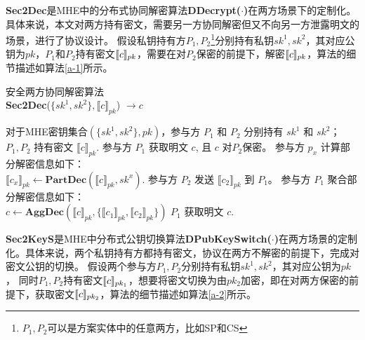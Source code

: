\textbf{Sec2Dec}是MHE中的分布式协同解密算法\textbf{DDecrypt($\cdot$)}在两方场景下的定制化。具体来说，本文对两方持有密文，需要另一方协同解密但又不向另一方泄露明文的场景，进行了协议设计。
假设私钥持有方$P_1,P_2$\footnote{$P_1,P_2$可以是方案实体中的任意两方，比如SP和CS}分别持有私钥$sk^1, sk^2$，其对应公钥为$ pk $，$ P_1 $和$P_2$持有密文$\ctx[pk]{c}$，需要在对$P_2$保密的前提下，解密$\ctx[pk]{c}$，算法的细节描述如算法\ref{a-1}所示。
\begin{algorithm}[htbp]
	\caption{安全两方协同解密算法\\ \textbf{Sec2Dec}($\{sk^1, sk^2\}, \llbracket c\rrbracket_{pk}$) $\rightarrow c$}
	\label{a-1}
	\begin{algorithmic}[1]
		\REQUIRE 对于MHE密钥集合$(\{sk^1, sk^2\}, pk)$，参与方 $P_1$ 和 $P_2$ 分别持有 $sk^1$ 和 $sk^2$；$P_1, P_2$ 持有密文 $\llbracket c\rrbracket_{pk}$.
		\ENSURE 参与方 $P_1$ 获取明文 $c$, 且 $c$ 对$ P_2 $保密。
		\STATE 参与方 $p_x$ 计算部分解密信息如下：\\ $\llbracket c_x\rrbracket_{pk} \leftarrow \textbf{PartDec}(\llbracket c\rrbracket_{pk}, sk^x)$. 
		\ENDFOR
		\STATE 参与方 $P_2$ 发送 $\llbracket c_2\rrbracket_{pk}$ 到 $P_1$。
		\STATE 参与方 $P_1$ 聚合部分解密信息如下：\\ $c \leftarrow \textbf{AggDec}(\llbracket c\rrbracket_{pk}, \{\llbracket c_1\rrbracket_{pk}, \llbracket c_2\rrbracket_{pk}\})$
		\RETURN $P_1$ 获取明文 $ c $.
	\end{algorithmic}
\end{algorithm}

\textbf{Sec2KeyS}是MHE中分布式公钥切换算法\textbf{DPubKeySwitch($ \cdot $)}在两方场景的定制化。具体来说，两个私钥持有方都持有密文，协议在两方不解密的前提下，完成对密文公钥的切换。
假设两个参与方$P_1, P_2$分别持有私钥$sk^1, sk^2$，其对应公钥为$ pk $，
同时$P_1, P_2$持有密文$ \ctx[pk_1]{c} $，想要将密文切换为由$ pk_2 $加密，即在对两方保密的前提下，获取密文$ \ctx[pk_2]{c} $，算法的细节描述如算法\ref{a-2}所示。

